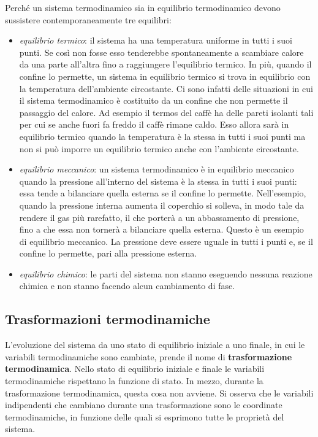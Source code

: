 Perché un sistema termodinamico sia in equilibrio termodinamico devono sussistere contemporaneamente tre equilibri:

\begin{itemize}
	\item \emph{equilibrio termico}: il sistema ha una temperatura uniforme in tutti i suoi punti. Se così non fosse esso tenderebbe spontaneamente a scambiare calore da una parte all'altra fino a raggiungere l'equilibrio termico. In più, quando il confine lo permette, un sistema in equilibrio termico si trova in equilibrio con la temperatura dell'ambiente circostante. Ci sono infatti delle situazioni in cui il sistema termodinamico è costituito da un confine che non permette il passaggio del calore. Ad esempio il termos del caffè ha delle pareti isolanti tali per cui se anche fuori fa freddo il caffè rimane caldo. Esso allora sarà in equilibrio termico quando la temperatura è la stessa in tutti i suoi punti ma non si può imporre un equilibrio termico anche con l'ambiente circostante.
	\item \emph{equilibrio meccanico}: un sistema termodinamico è in equilibrio meccanico quando la pressione all'interno del sistema è la stessa in tutti i suoi punti: essa tende a bilanciare quella esterna se il confine lo permette. Nell'esempio, quando la pressione interna aumenta il coperchio si solleva, in modo tale da rendere il gas più rarefatto, il che porterà a un abbassamento di pressione, fino a che essa non tornerà a bilanciare quella esterna. Questo è un esempio di equilibrio meccanico. La pressione deve essere uguale in tutti i punti e, se il confine lo permette, pari alla pressione esterna.
	\item \emph{equilibrio chimico}: le parti del sistema non stanno eseguendo nessuna reazione chimica e non stanno facendo alcun cambiamento di fase.
\end{itemize}

\subsection{Trasformazioni termodinamiche}

L'evoluzione del sistema da uno stato di equilibrio iniziale a uno finale, in cui le variabili termodinamiche sono cambiate, prende il nome di \textbf{trasformazione termodinamica}. Nello stato di equilibrio iniziale e finale le variabili termodinamiche rispettano la funzione di stato. In mezzo, durante la trasformazione termodinamica, questa cosa non avviene. Si osserva che le variabili indipendenti che cambiano durante una trasformazione sono le coordinate termodinamiche, in funzione delle quali si esprimono tutte le proprietà del sistema.

